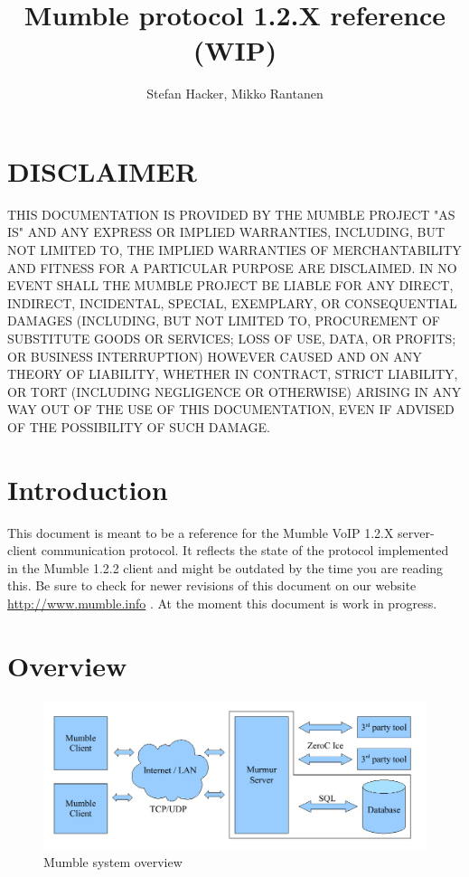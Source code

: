 \documentclass[11pt]{article} %
\title{Mumble protocol 1.2.X reference (WIP)}
\author{Stefan Hacker, Mikko Rantanen}
\begin{document}
\maketitle

\newpage
\section*{DISCLAIMER}

THIS DOCUMENTATION IS PROVIDED BY THE MUMBLE PROJECT "AS IS" AND ANY EXPRESS OR IMPLIED WARRANTIES, INCLUDING, BUT NOT LIMITED TO, THE IMPLIED WARRANTIES OF MERCHANTABILITY AND FITNESS FOR A PARTICULAR PURPOSE ARE DISCLAIMED. IN NO EVENT SHALL THE MUMBLE PROJECT BE LIABLE FOR ANY DIRECT, INDIRECT, INCIDENTAL, SPECIAL, EXEMPLARY, OR CONSEQUENTIAL DAMAGES (INCLUDING, BUT NOT LIMITED TO, PROCUREMENT OF SUBSTITUTE GOODS OR SERVICES; LOSS OF USE, DATA, OR PROFITS; OR BUSINESS INTERRUPTION) HOWEVER CAUSED AND ON ANY THEORY OF LIABILITY, WHETHER IN CONTRACT, STRICT LIABILITY, OR TORT (INCLUDING NEGLIGENCE OR OTHERWISE) ARISING IN ANY WAY OUT OF THE USE OF THIS DOCUMENTATION, EVEN IF ADVISED OF THE POSSIBILITY OF SUCH DAMAGE. 

\tableofcontents
\newpage

\section{Introduction}
This document is meant to be a reference for the Mumble VoIP 1.2.X server-client communication protocol. It reflects the state of the protocol implemented in the Mumble 1.2.2 client and might be outdated by the time you are reading this. Be sure to check for newer revisions of this document on our website \url{http://www.mumble.info} . At the moment this document is work in progress.

\section{Overview}

\begin{figure}[ht]
	\centering
	\includegraphics[width=\linewidth]{resources/mumble_system_overview}
	\caption{Mumble system overview}
	\label{fig:mumble_system_overview}
\end{figure}
\end{document}

